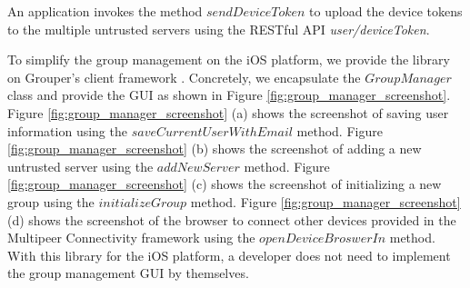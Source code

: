 \documentclass[a4paper,11pt]{report}
\begin{document}
An application invokes the method $sendDeviceToken$ to upload the device tokens to the multiple untrusted servers using the RESTful API \emph{user/deviceToken}.

To simplify the group management on the iOS platform, we provide the library on Grouper's client framework .
Concretely, we encapsulate the $GroupManager$ class and provide the GUI as shown in Figure \ref{fig:group_manager_screenshot}.
Figure \ref{fig:group_manager_screenshot} (a) shows the screenshot of saving user information using the  $saveCurrentUserWithEmail$ method.
Figure \ref{fig:group_manager_screenshot} (b) shows the screenshot of adding a new untrusted server using the  $addNewServer$ method.
Figure \ref{fig:group_manager_screenshot} (c) shows the screenshot of initializing a new group using the  $initializeGroup$ method.
Figure \ref{fig:group_manager_screenshot} (d) shows the screenshot of the browser to connect other devices provided in the Multipeer Connectivity framework using the $openDeviceBroswerIn$ method.
With this library for the iOS platform, a developer does not need to implement the group management GUI by themselves.
\end{document}
